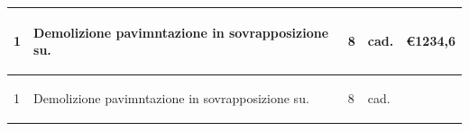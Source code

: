 \documentclass[a4paper]{article}
\begin{document}
\begin{tabular}{ | L{10mm} |  L{86mm} | L{12mm} | L{12mm} | L{16mm} | }
                    \vspace{2.5mm}
                    \begin{spacing}{0}
                      1
                    \end{spacing} &
                    \vspace{2.5mm}
                    \begin{spacing}{0}
                    Demolizione pavimntazione in sovrapposizione su.
                    \end{spacing} &
                    \vspace{2.5mm}
                    \begin{spacing}{0}
                      8
                    \end{spacing} &
                    \vspace{2.5mm}
                    \begin{spacing}{0}
                      cad.
                    \end{spacing} &
                    \vspace{2.5mm}
                    \begin{spacing}{0}
                      \euro\hfill 1234,6
                    \end{spacing} \\
                    \hline
                    \vspace{2.5mm}
                    \begin{spacing}{0}
                      1
                    \end{spacing} &
                    \vspace{2.5mm}
                    \begin{spacing}{0}
                    Demolizione pavimntazione in sovrapposizione su.
                    \end{spacing} &
                    \vspace{2.5mm}
                    \begin{spacing}{0}
                      8
                    \end{spacing} &
                    \vspace{2.5mm}
                    \begin{spacing}{0}
                      cad.
                    \end{spacing} &
                    \vspace{2.5mm}
                    \begin{spacing}{0}

\end{spacing}
\end{tabular}
\end{document}
